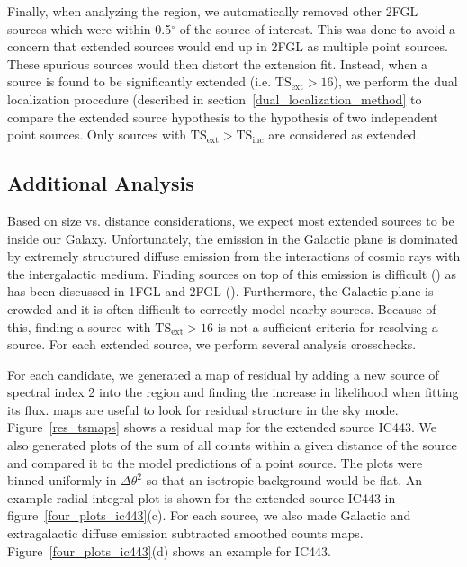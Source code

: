 \documentclass[12pt,preprint]{aastex}
\newcommand{\gev}{\text{GeV}\xspace}
\newcommand{\tsext}{{\ensuremath{\text{TS}_{\text{ext}}}}\xspace}
\newcommand{\tsinc}{\ensuremath{\text{TS}_{\text{inc}}}\xspace}
\newcommand{\ts}{\text{TS}\xspace}
\renewcommand{\deg}{\ensuremath{^\circ}\xspace}
\begin{document}
Finally, when analyzing the region, we automatically removed other 2FGL
sources which were within 0.5\deg of the source of interest. This was
done to avoid a concern that extended sources would end up in 2FGL as
multiple point sources. These spurious sources would then distort the
extension fit.  Instead, when a source is found to be significantly
extended (i.e. $\tsext>16$), we perform the dual localization procedure
(described in section~\ref{dual_localization_method} to compare the
extended source hypothesis to the hypothesis of two independent point
sources. Only sources with $\tsext>\tsinc$ are considered as extended.

\subsection{Additional Analysis}

Based on size vs. distance considerations,
we expect most extended sources to be inside our Galaxy.  Unfortunately, the \gev emission
in the Galactic plane is dominated by extremely structured 
diffuse emission from the interactions of cosmic rays with the
intergalactic medium.  Finding sources on top of this emission is difficult
(\cite{first_diffuse_paper}) as has been discussed in 1FGL and 2FGL
(\cite{first_cat,second_cat}).  Furthermore, the Galactic plane is crowded
and it is often difficult to correctly model nearby sources.  Because of this,
finding a source with $\tsext>16$ is not a sufficient
criteria for resolving a source. For each extended source,
we perform several analysis crosschecks.

For each candidate, we generated a map of residual \ts by adding a new
source of spectral index 2 into the region and finding the increase in
likelihood when fitting its flux. \ts maps are useful to look for residual
structure in the sky mode.  Figure~\ref{res_tsmaps} shows a residual \ts
map for the extended source IC443.  We also generated plots of the sum of
all counts within a given distance of the source and compared it to the
model predictions of a point source.  The plots were binned uniformly
in $\Delta \theta^2$ so that an isotropic background would be flat.
An example radial integral plot is shown for the extended source IC443
in figure~\ref{four_plots_ic443}(c).  For each source, we also made
Galactic and extragalactic diffuse emission subtracted smoothed counts
maps. Figure~\ref{four_plots_ic443}(d) shows an example for IC443.
\end{document}
